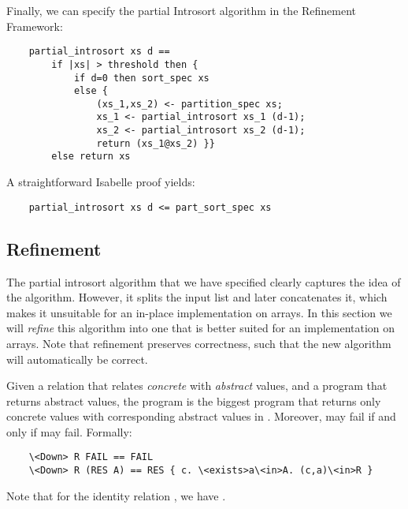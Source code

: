 \documentclass[sigplan,10pt,anonymous,review]{acmart}\settopmatter{printfolios=true,printccs=false,printacmref=false}
\theoremstyle{definition}
\begin{document}
%
  Finally, we can specify the partial Introsort algorithm in the Refinement Framework:
  \begin{lstlisting}
    partial_introsort xs d ==
        if |xs| > threshold then {
            if d=0 then sort_spec xs
            else {
                (xs_1,xs_2) <- partition_spec xs;
                xs_1 <- partial_introsort xs_1 (d-1);
                xs_2 <- partial_introsort xs_2 (d-1);
                return (xs_1@xs_2) }}
        else return xs
  \end{lstlisting}
%
  A straightforward Isabelle proof yields:
  \begin{theorem}\label{thm:partial_introsort_correct}
  \begin{lstlisting}
    partial_introsort xs d <= part_sort_spec xs
  \end{lstlisting}
  \end{theorem}

\subsection{Refinement}\label{sec:refinement}
  The partial introsort algorithm that we have specified clearly captures the idea of the algorithm.
  However, it splits the input list and later concatenates it, which makes it unsuitable for an in-place
  implementation on arrays. In this section we will \emph{refine} this algorithm into one that is better suited
  for an implementation on arrays. Note that refinement preserves correctness, such that the new algorithm will
  automatically be correct.

  Given a relation  that relates \emph{concrete} with \emph{abstract} values, and a program  that returns abstract values,
  the program  is the biggest program that returns only concrete values with corresponding abstract values in .
  Moreover,  may fail if and only if  may fail. Formally:
  \begin{lstlisting}
    \<Down> R FAIL == FAIL
    \<Down> R (RES A) == RES { c. \<exists>a\<in>A. (c,a)\<in>R }
  \end{lstlisting}
  Note that for the identity relation , we have .
\end{document}
